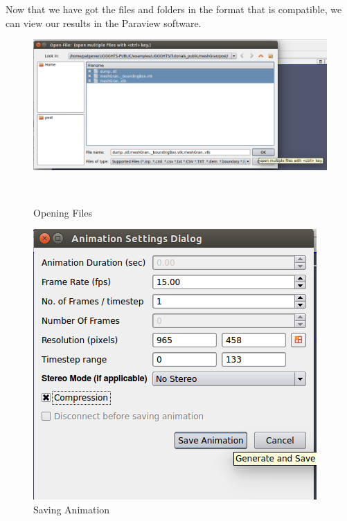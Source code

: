 \documentclass{tufte-book} %
\begin{document}
Now that we have got the files and folders in the format that is compatible, we can view our results in the Paraview software.
\begin{figure}
  \includegraphics[width=\linewidth]{graphics/Screenshot/P2.png}
  \caption{Opening Files}
  \\\vspace{\baselineskip}
\end{figure}
\begin{figure}
  \includegraphics[width=\linewidth]{graphics/Screenshot/P5.png}
  
  \caption{Saving Animation}
  \label{fig:P5}
\end{figure}
\\\vspace{\baselineskip}
\end{document}
